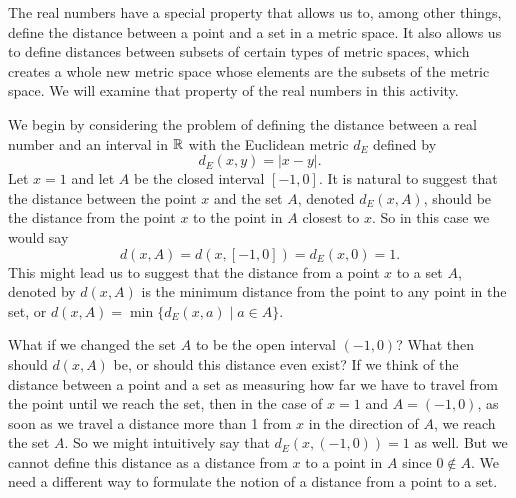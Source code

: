 \label{sec:glb}


\vspace*{-17 pt}

\vspace*{13 pt}


The real numbers have a special property that allows us to, among other things, define the distance between a point and a set in a metric space. It also allows us to define distances between subsets of certain types of metric spaces, which creates a whole new metric space whose elements are the subsets of the metric space. We will examine that property of the real numbers in this activity. 

We begin by considering the problem of defining the distance between a real number and an interval in $\mathbb{R}$ with the Euclidean metric $d_E$ defined by 
\[d_E(x,y) = | x-y |.\]
Let $x = 1$ and let $A$ be the closed interval $[-1,0]$. It is natural to suggest that the distance between the point $x$ and the set $A$, denoted $d_E(x,A)$, should be the distance from the point $x$ to the point in $A$ closest to $x$. So in this case we would say 
\[d(x,A) = d(x,[-1,0]) = d_E(x,0) = 1.\]
This might lead us to suggest that the distance from a point $x$ to a set $A$, denoted by $d(x,A)$ is the minimum distance from the point to any point in the set, or $d(x,A) = \min\{d_E(x,a) \mid a \in A\}$. 

What if we changed the set $A$ to be the open interval $(-1,0)$? What then should $d(x,A)$ be, or should this distance even exist? If we think of the distance between a point and a set as measuring how far we have to travel from the point until we reach the set, then in the case of $x=1$ and $A=(-1,0)$, as soon as we travel a distance more than 1 from $x$ in the direction of $A$, we reach the set $A$. So we might intuitively say that $d_E(x,(-1,0)) = 1$ as well. But we cannot define this distance as a distance from $x$ to a point in $A$ since $0 \notin A$. We need a different way to formulate the notion of a distance from a point to a set.

